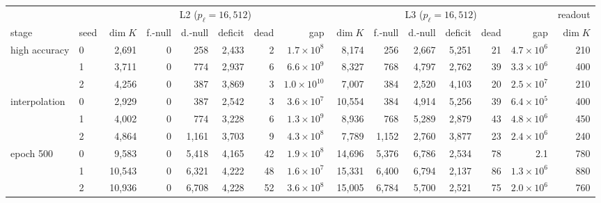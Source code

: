 \begin{tabular}{llrrrrrrrrrrrrr}
\toprule
 & & \multicolumn{6}{c}{L2 ($p_\ell=16{,}512$)} & \multicolumn{6}{c}{L3 ($p_\ell=16{,}512$)} & readout \\
\cmidrule(lr){3-8}\cmidrule(lr){9-14}
stage & seed & $\dim K$ & f.-null & d.-null & deficit & dead & gap & $\dim K$ & f.-null & d.-null & deficit & dead & gap & $\dim K$ \\
\midrule
high accuracy & 0 & 2{,}691 & 0 & 258 & 2{,}433 & 2 & $1.7\!\times\!10^{8}$ & 8{,}174 & 256 & 2{,}667 & 5{,}251 & 21 & $4.7\!\times\!10^{6}$ & 210 \\
 & 1 & 3{,}711 & 0 & 774 & 2{,}937 & 6 & $6.6\!\times\!10^{9}$ & 8{,}327 & 768 & 4{,}797 & 2{,}762 & 39 & $3.3\!\times\!10^{6}$ & 400 \\
 & 2 & 4{,}256 & 0 & 387 & 3{,}869 & 3 & $1.0\!\times\!10^{10}$ & 7{,}007 & 384 & 2{,}520 & 4{,}103 & 20 & $2.5\!\times\!10^{7}$ & 210 \\
\addlinespace
interpolation & 0 & 2{,}929 & 0 & 387 & 2{,}542 & 3 & $3.6\!\times\!10^{7}$ & 10{,}554 & 384 & 4{,}914 & 5{,}256 & 39 & $6.4\!\times\!10^{5}$ & 400 \\
 & 1 & 4{,}002 & 0 & 774 & 3{,}228 & 6 & $1.3\!\times\!10^{9}$ & 8{,}936 & 768 & 5{,}289 & 2{,}879 & 43 & $4.8\!\times\!10^{6}$ & 450 \\
 & 2 & 4{,}864 & 0 & 1{,}161 & 3{,}703 & 9 & $4.3\!\times\!10^{8}$ & 7{,}789 & 1{,}152 & 2{,}760 & 3{,}877 & 23 & $2.4\!\times\!10^{6}$ & 240 \\
\addlinespace
epoch 500 & 0 & 9{,}583 & 0 & 5{,}418 & 4{,}165 & 42 & $1.9\!\times\!10^{8}$ & 14{,}696 & 5{,}376 & 6{,}786 & 2{,}534 & 78 & 2.1 & 780 \\
 & 1 & 10{,}543 & 0 & 6{,}321 & 4{,}222 & 48 & $1.6\!\times\!10^{7}$ & 15{,}331 & 6{,}400 & 6{,}794 & 2{,}137 & 86 & $1.3\!\times\!10^{6}$ & 880 \\
 & 2 & 10{,}936 & 0 & 6{,}708 & 4{,}228 & 52 & $3.6\!\times\!10^{8}$ & 15{,}005 & 6{,}784 & 5{,}700 & 2{,}521 & 75 & $2.0\!\times\!10^{6}$ & 760 \\
\bottomrule
\end{tabular}
